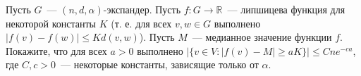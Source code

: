 Пусть $G$~--- $(n, d, \alpha)$-экспандер. Пусть $f: G \rightarrow \mathbb{R}$~--- липшицева функция для
некоторой константы $K$ (т. е. для всех $v, w \in G$ выполнено $|f(v) - f(w)| \le K d(v, w)$). Пусть
$M$~--- медианное значение функции $f$. Покажите, что для всех $a > 0$ выполнено
$|\{v \in V: |f(v) - M| \ge a K \}| \le C n e^{-ca}$, где $C, c > 0$~--- некоторые константы, зависящие
только от $\alpha$.
